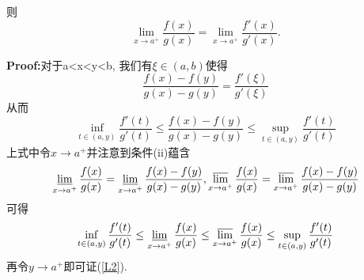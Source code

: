 \documentclass{ctexart}
\begin{document}
则
\begin{equation}
\lim_{x\rightarrow a^+} {\frac{f(x)}{g(x)}}=\lim_{x\rightarrow a^+} {\frac{f'(x)}{g'(x)}}.\label{L2}
\end{equation}

\textbf{Proof:}对于a<x<y<b, 我们有$\xi\in(a,b)$使得
\begin{equation}
\frac{f(x)-f(y)}{g(x)-g(y)}=\frac{f'(\xi)}{g'(\xi)}
\end{equation}
从而
\begin{equation}
\inf_{t\in(a,y)}\frac{f'(t)}{g'(t)}\leq\frac{f(x)-f(y)}{g(x)-g(y)}\leq\sup_{t\in(a,y)}\frac{f'(t)}{g'(t)}
\end{equation}
上式中令$x\rightarrow a^+$并注意到条件(ii)蕴含
\begin{equation}
\varliminf_{x\rightarrow a^+}\frac{f(x)}{g(x)}=\varliminf_{x\rightarrow a^+}\frac{f(x)-f(y)}{g(x)-g(y)}, 
\varlimsup_{x\rightarrow a^+}\frac{f(x)}{g(x)}=\varlimsup_{x\rightarrow a^+}\frac{f(x)-f(y)}{g(x)-g(y)}
\end{equation}
可得
\begin{equation}
\inf_{t\in(a,y)}\frac{f'(t)}{g'(t)}\leq\varliminf_{x\rightarrow a^+}\frac{f(x)}{g(x)}
\leq\varlimsup_{x\rightarrow a^+}\frac{f(x)}{g(x)}\leq\sup_{t\in(a,y)}\frac{f'(t)}{g'(t)}
\end{equation}
再令$y\rightarrow a^+$即可证(\ref{L2}).
\end{document}

